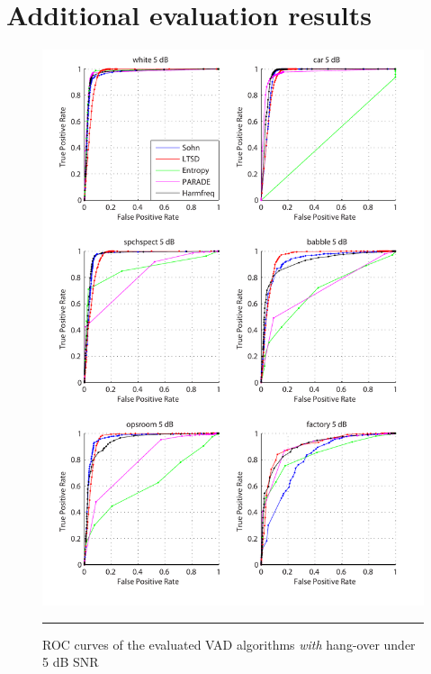 
\chapter{Additional evaluation results} %

\label{AppendixA} %


\begin{figure}[htbp]
	\centering
		\includegraphics[width=1.0\columnwidth]{Figures/Chapter4/5dBh.pdf}
		\rule{37em}{0.5pt}
	\caption[ROC curves of the evaluated algorithms \emph{with} hang-over under 5 dB SNR]{ROC curves of the evaluated VAD algorithms \emph{with} hang-over under 5 dB SNR}
	\label{fig:5dBh}
\end{figure}

